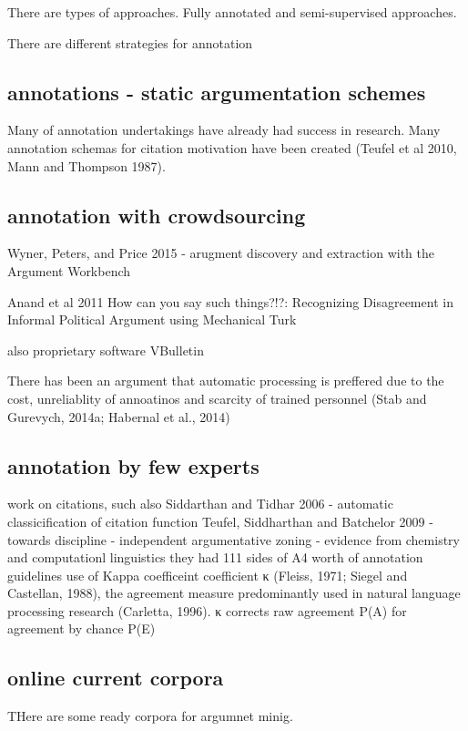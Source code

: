 \documentclass{article}
\begin{document}
There are types of approaches. Fully annotated and  semi-supervised approaches.

There are different strategies for annotation

\subsection{annotations - static argumentation schemes}
Many of annotation undertakings have already had success in research. 
Many annotation schemas for citation motivation have been created (Teufel et al 2010, Mann and Thompson 1987). 

\subsection{annotation with crowdsourcing}

Wyner, Peters, and Price 2015 - arugment discovery and extraction with the Argument Workbench

Anand et al 2011 How can you say such things?!?: Recognizing Disagreement in Informal Political Argument
using Mechanical Turk

also proprietary software VBulletin

There has been an argument that automatic processing is preffered due to the cost, unreliablity of annoatinos and scarcity of trained personnel
(Stab and Gurevych, 2014a; Habernal et al., 2014)

\subsection{annotation by few experts}

work on citations, such also
Siddarthan and Tidhar 2006 - automatic classicification of citation function
Teufel, Siddharthan and Batchelor  2009 - towards discipline - independent argumentative zoning - evidence from chemistry and computationl linguistics
they had 111 sides of A4 worth of annotation guidelines
use of Kappa coefficeint
coefficient κ (Fleiss, 1971; Siegel and Castellan, 1988), the agreement measure predominantly used in natural language processing research (Carletta, 1996). κ corrects raw agreement P(A) for agreement by chance P(E)

\subsection{online current corpora}
THere are some ready corpora for argumnet minig.
\end{document}
